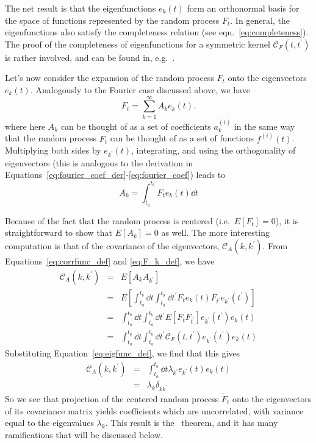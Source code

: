 The net result is that the eigenfunctions $e_k(t)$ form an orthonormal
basis for the space of functions represented by the random process $F_t$.
In general, the eigenfunctions
also satisfy the completeness relation (see eqn.~\ref{eq:completeness}).
The proof of the completeness of eigenfunctions for a symmetric kernel
$\mathcal{C}_F(t, t^\prime)$ is rather involved, and
can be found in, e.g.~\citet{Courant1989}.

Let's now consider the expansion of the random process $F_t$ onto the
eigenvectors $e_k(t)$.  Analogously to the Fourier case discussed
above, we have
\begin{equation}
  \label{eq:Ft_decomp}
  F_t = \sum_{k=1}^\infty A_k e_k(t).
\end{equation}
where here $A_k$ can be thought of as a set of coefficients $a_k^{(i)}$
in the same way that the random process $F_t$ can be thought of as a
set of functions $f^{(i)}(t)$.
Multiplying both sides by $e_{k^\prime}(t)$, integrating, and using the
orthogonality of eigenvectors (this is analogous to the derivation
in Equations~\ref{eq:fourier_coef_der}-\ref{eq:fourier_coef}) leads to
\begin{equation}
  \label{eq:F_k_def}
  A_k = \int_{t_a}^{t_b} F_t e_k(t) \dd t
\end{equation}

Because of the fact that the random process is centered (i.e.~$E[F_t] = 0$),
it is straightforward to show that $E[A_k] = 0$ as well.  The more interesting
computation is that of the covariance of the eigenvectors,
$\mathcal{C}_A(k, k^\prime)$.
From Equations~\ref{eq:corrfunc_def} and \ref{eq:F_k_def}, we have
\begin{eqnarray}
  \mathcal{C}_A(k, k^\prime)
  &=& E[A_k A_{k^\prime}]\nonumber\\
  &=& E\left[\int_{t_a}^{t_b} \dd t \int_{t_a}^{t_b} \dd t^\prime
    {F}_t e_k(t)
    {F}_{t^\prime} e_{k^\prime}(t^\prime)\right] \nonumber\\
  &=& \int_{t_a}^{t_b} \dd t \int_{t_a}^{t_b} \dd t^\prime
    E[{F}_t {F}_{t^\prime}]
    e_{k^\prime}(t^\prime) e_k(t) \nonumber\\
  &=& \int_{t_a}^{t_b} \dd t \int_{t_a}^{t_b} \dd t^\prime
    \mathcal{C}_F(t, t^\prime)
    e_{k^\prime}(t^\prime) e_k(t) \nonumber
\end{eqnarray}
Substituting Equation~\ref{eq:eigfunc_def}, we find that this gives
\begin{eqnarray}
  \label{eq:cov_A}
  \mathcal{C}_A(k, k^\prime)
  &=& \int_{t_a}^{t_b} \dd t \lambda_{k^\prime} e_{k^\prime}(t) e_k(t) \nonumber\\
  &=& \lambda_k \delta_{kk^\prime}
\end{eqnarray}
So we see that projection of the centered random process $\tilde{F}_t$ onto
the eigenvectors of its covariance matrix yields coefficients which
are uncorrelated, with variance equal to the eigenvalues $\lambda_k$.
This result is the \KL\ theorem, and it has many ramifications that will
be discussed below.

